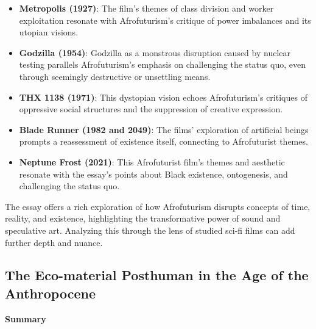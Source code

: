 \documentclass[11pt,fleqn]{book} %
\begin{document}
\begin{itemize}
\item \textbf{Metropolis (1927)}:  The film's themes of class division and worker exploitation resonate with Afrofuturism's critique of power imbalances and its utopian visions. 

\item \textbf{Godzilla (1954)}:  Godzilla as a monstrous disruption caused by nuclear testing parallels Afrofuturism's emphasis on challenging the status quo, even through seemingly destructive or unsettling means.

\item \textbf{THX 1138 (1971)}: This dystopian vision echoes Afrofuturism's critiques of oppressive social structures and the suppression of creative expression.

\item \textbf{Blade Runner (1982 and 2049)}: The films' exploration of artificial beings prompts a reassessment of existence itself, connecting to Afrofuturist themes.

\item \textbf{Neptune Frost (2021)}: This Afrofuturist film's themes and aesthetic resonate with the essay's points about Black existence, ontogenesis, and challenging the status quo.
\end{itemize}

\vspace{5pt}

The essay offers a rich exploration of how Afrofuturism disrupts concepts of time, reality, and existence, highlighting the transformative power of sound and speculative art. Analyzing this through the lens of studied sci-fi films can add further depth and nuance. 



\subsection{The Eco-material Posthuman in the Age of the Anthropocene}
\textbf{Summary}
\end{document}
